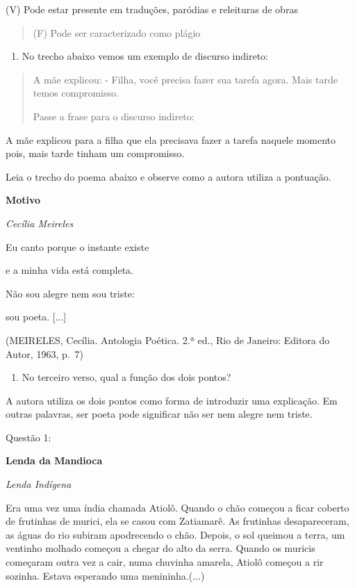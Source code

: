 {(V) Pode estar presente em traduções, paródias e releituras de obras

\begin{quote}
(F) Pode ser caracterizado como plágio
\end{quote}

\begin{enumerate}
\def\labelenumi{\arabic{enumi})}
\setcounter{enumi}{8}
\tightlist
\item
  No trecho abaixo vemos um exemplo de discurso indireto:
\end{enumerate}

\begin{quote}
A mãe explicou: - Filha, você precisa fazer sua tarefa agora. Mais tarde
temos compromisso.

Passe a frase para o discurso indireto:
\end{quote}

A mãe explicou para a filha que ela precisava fazer a tarefa naquele
momento pois, mais tarde tinham um compromisso.

Leia o trecho do poema abaixo e observe como a autora utiliza a
pontuação.

\textbf{Motivo}

\emph{Cecília Meireles}

Eu canto porque o instante existe

e a minha vida está completa.

Não sou alegre nem sou triste:

sou poeta. {[}...{]}

(MEIRELES, Cecília. Antologia Poética. 2.ª ed., Rio de Janeiro: Editora
do Autor, 1963, p.~7)

\begin{enumerate}
\def\labelenumi{\arabic{enumi})}
\setcounter{enumi}{9}
\tightlist
\item
  No terceiro verso, qual a função dos dois pontos?
\end{enumerate}

A autora utiliza os dois pontos como forma de introduzir uma explicação.
Em outras palavras, ser poeta pode significar não ser nem alegre nem
triste.


Questão 1:

\textbf{Lenda da Mandioca}

\emph{Lenda Indígena}

Era uma vez uma índia chamada Atiolô. Quando o chão começou a ficar
coberto de frutinhas de murici, ela se casou com Zatiamarê. As frutinhas
desapareceram, as águas do rio subiram apodrecendo o chão. Depois, o sol
queimou a terra, um ventinho molhado começou a chegar do alto da serra.
Quando os muricis começaram outra vez a cair, numa chuvinha amarela,
Atiolô começou a rir sozinha. Estava esperando uma menininha.(...)

}
